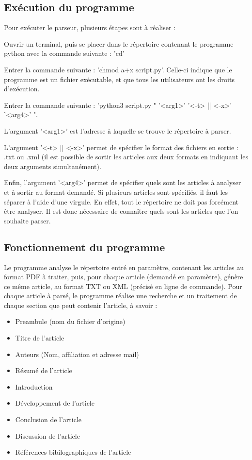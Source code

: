 \documentclass[11pt,a4paper]{article}
\begin{document}
\subsection{Exécution du programme}

Pour exécuter le parseur, plusieurs étapes sont à réaliser : 

\begin{etapes}
\item  Ouvrir un terminal, puis se placer dans le répertoire contenant le programme python avec la commande suivante : 'cd'
\item Entrer la commande suivante : 'chmod a+x script.py'. Celle-ci indique que le programme est un fichier exécutable, et que tous les utilisateurs ont les droits d'exécution.
\item Entrer la commande suivante : 'python3 script.py " '<arg1>'  '<-t> || <-x>'  '<arg4>' ".

L'argument '<arg1>' est l'adresse à laquelle se trouve le répertoire à parser. 

L'argument '<-t> || <-x>' permet de spécifier le format des fichiers en sortie : .txt ou .xml (il est possible de sortir les articles aux deux formats en indiquant les deux arguments simultanément). 

Enfin, l'argument '<arg4>' permet de spécifier quels sont les articles à analyser et à sortir au format demandé. Si plusieurs articles sont spécifiés, il faut les séparer à l'aide d'une virgule. En effet, tout le répertoire ne doit pas forcément être analyser. Il est donc nécessaire de connaître quels sont les articles que l'on souhaite parser.

\end{etapes}

\subsection{Fonctionnement du programme}

Le programme analyse le répertoire entré en paramètre, contenant les articles au format PDF à traiter, puis, pour chaque article (demandé en paramètre), génère ce même article, au format TXT ou XML (précisé en ligne de commande).
Pour chaque article à parsé, le programme réalise une recherche et un traitement de chaque section que peut contenir l'article, à savoir :

\begin{itemize}

\item Preambule (nom du fichier d'origine)
\item Titre de l'article
\item Auteurs (Nom, affiliation et adresse mail)
\item Résumé de l'article
\item Introduction
\item Développement de l'article
\item Conclusion de l'article
\item Discussion de l'article
\item Références bibilographiques de l'article
\end{itemize}
\end{document}
